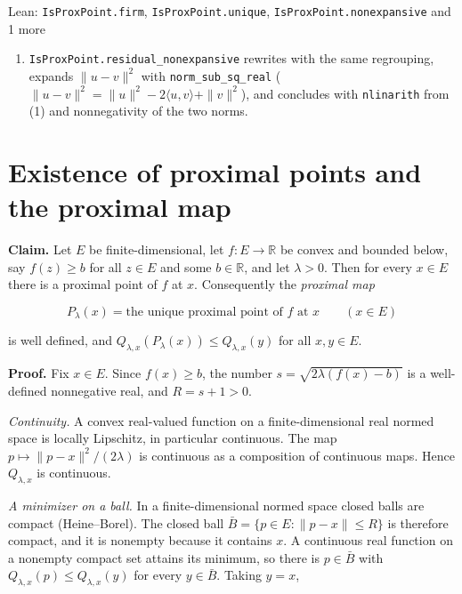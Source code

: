 \documentclass[11pt,a4paper]{article}
\begin{document}
\begin{leanbox}{Lean: \texttt{IsProxPoint.\allowbreak{}firm}, \texttt{IsProxPoint.\allowbreak{}unique}, \texttt{IsProxPoint.\allowbreak{}nonexpansive} and 1 more}
\begin{enumerate}
\item \texttt{Is\allowbreak{}Prox\allowbreak{}Point.\allowbreak{}residual\_\allowbreak{}nonexpansive} rewrites with the same regrouping, expands \(\|u-v\|^2\) with \texttt{norm\_\allowbreak{}sub\_\allowbreak{}sq\_\allowbreak{}real} (\(\|u-v\|^2=\|u\|^2-2\langle u,v\rangle+\|v\|^2\)), and concludes with \texttt{nlinarith} from (1) and nonnegativity of the two norms.

\end{enumerate}
\end{leanbox}

\section{\texorpdfstring{Existence of proximal points and the proximal map}{Existence of proximal points and the proximal map}}


\textbf{Claim.} Let \(E\) be finite-dimensional, let \(f:E\to\mathbb R\) be convex and bounded below, say \(f(z)\ge b\) for all \(z\in E\) and some \(b\in\mathbb R\), and let \(\lambda>0\). Then for every \(x\in E\) there is a proximal point of \(f\) at \(x\). Consequently the \emph{proximal map}


\[P_\lambda(x)=\text{the unique proximal point of }f\text{ at }x\qquad(x\in E)\]


is well defined, and \(Q_{\lambda,x}(P_\lambda(x))\le Q_{\lambda,x}(y)\) for all \(x,y\in E\).




\textbf{Proof.} Fix \(x\in E\). Since \(f(x)\ge b\), the number \(s=\sqrt{2\lambda(f(x)-b)}\) is a well-defined nonnegative real, and \(R=s+1>0\).




\emph{Continuity.} A convex real-valued function on a finite-dimensional real normed space is locally Lipschitz, in particular continuous. The map \(p\mapsto\|p-x\|^2/(2\lambda)\) is continuous as a composition of continuous maps. Hence \(Q_{\lambda,x}\) is continuous.




\emph{A minimizer on a ball.} In a finite-dimensional normed space closed balls are compact (Heine–Borel). The closed ball \(\bar B=\{p\in E:\|p-x\|\le R\}\) is therefore compact, and it is nonempty because it contains \(x\). A continuous real function on a nonempty compact set attains its minimum, so there is \(p\in\bar B\) with \(Q_{\lambda,x}(p)\le Q_{\lambda,x}(y)\) for every \(y\in\bar B\). Taking \(y=x\),
\end{document}
